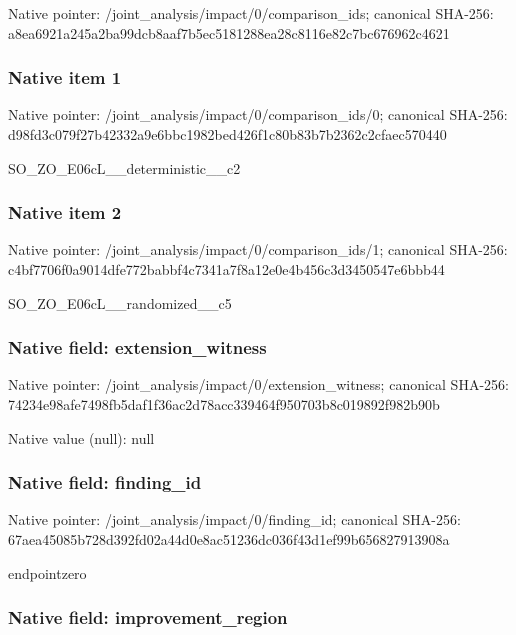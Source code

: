 \documentclass[10pt,a4paper]{article}
\begin{document}
Native pointer: /joint\_analysis/impact/0/comparison\_ids; canonical SHA-256: a8ea6921a245a2ba99dcb8aa\allowbreak{}f7b5ec5181288ea28c8116e8\allowbreak{}2c7bc676962c4621



\subsubsection{Native item 1}


Native pointer: /joint\_analysis/impact/0\allowbreak{}/comparison\_ids/0; canonical SHA-256: d98fd3c079f27b42332a9e6b\allowbreak{}bc1982bed426f1c80b83b7b2\allowbreak{}362c2cfaec570440


SO\_ZO\_E06cL\_\_deterministic\_\_c2


\subsubsection{Native item 2}


Native pointer: /joint\_analysis/impact/0\allowbreak{}/comparison\_ids/1; canonical SHA-256: c4bf7706f0a9014dfe772bab\allowbreak{}bf4c7341a7f8a12e0e4b456c\allowbreak{}3d3450547e6bbb44


SO\_ZO\_E06cL\_\_randomized\_\_c5


\subsubsection{Native field: extension\_witness}


Native pointer: /joint\_analysis/impact/0\allowbreak{}/extension\_witness; canonical SHA-256: 74234e98afe7498fb5daf1f3\allowbreak{}6ac2d78acc339464f950703b\allowbreak{}8c019892f982b90b



Native value (null): null



\subsubsection{Native field: finding\_id}


Native pointer: /joint\_analysis/impact/0/finding\_id; canonical SHA-256: 67aea45085b728d392fd02a4\allowbreak{}4d0e8ac51236dc036f43d1ef\allowbreak{}99b656827913908a


endpointzero


\subsubsection{Native field: improvement\_region}
\end{document}
